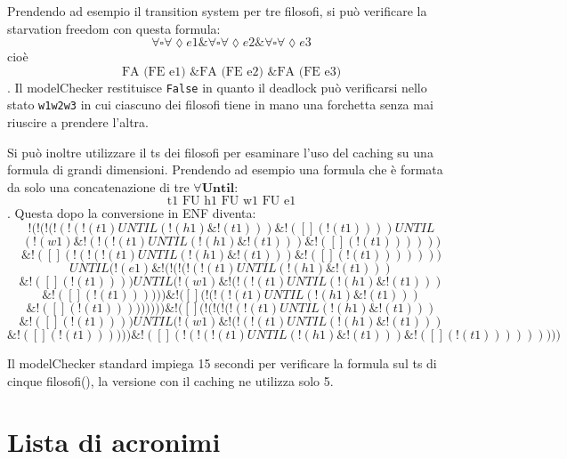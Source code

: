 \documentclass[a4paper, 10pt]{article}
\numberwithin{equation}{theor}
\begin{document}
Prendendo ad esempio il transition system per tre filosofi, si può verificare la starvation freedom con questa formula:
$$ \forall \square \forall \lozenge e1 \& \forall \square \forall \lozenge e2 \& \forall \square \forall \lozenge e3$$
cioè
$$ \text{FA (FE e1) \& FA (FE e2) \& FA (FE e3)} $$.
Il modelChecker restituisce \texttt{False} in quanto il deadlock può verificarsi nello stato \texttt{w1w2w3} in cui
ciascuno dei filosofi tiene in mano una forchetta senza mai riuscire a prendere l'altra.

Si può inoltre utilizzare il ts dei filosofi per esaminare l'uso del caching su una formula di grandi dimensioni.
Prendendo ad esempio una formula che è formata da solo una concatenazione di tre $\forall \boldsymbol{Until}$:
$$ \text{t1 FU h1 FU w1 FU e1}$$.
Questa dopo la conversione in \ac{ENF} diventa:
$$!(!(!(!(!(!(t1)UNTIL(!(h1)\&!(t1))) \& !([](!(t1))))UNTIL $$
$$(!(w1)\&!(!(!(t1)UNTIL(!(h1)\&!(t1))) \& !([](!(t1)))))) $$
$$ \& !([](!(!(!(t1)UNTIL(!(h1)\&!(t1))) \& !([](!(t1)))))))$$
$$UNTIL(!(e1)\&!(!(!(!(!(t1)UNTIL(!(h1)\&!(t1))) $$
$$ \& !([](!(t1))))UNTIL(!(w1)\&!(!(!(t1)UNTIL(!(h1)\&!(t1))) $$
$$\& !([](!(t1)))))) \& !([](!(!(!(t1)UNTIL(!(h1)\&!(t1))) $$
$$ \& !([](!(t1))))))))) \& !([](!(!(!(!(!(t1)UNTIL(!(h1)\&!(t1))) $$
$$\& !([](!(t1))))UNTIL(!(w1)\&!(!(!(t1)UNTIL(!(h1)\&!(t1))) $$
$$ \& !([](!(t1)))))) \& !([](!(!(!(t1)UNTIL(!(h1)\&!(t1))) \& !([](!(t1)))))))))$$

Il modelChecker standard impiega 15 secondi per verificare la formula sul ts di cinque filosofi(), la versione con il caching ne utilizza solo 5.









\section*{Lista di acronimi}
\begin{acronym}
\end{acronym}
\end{document}
